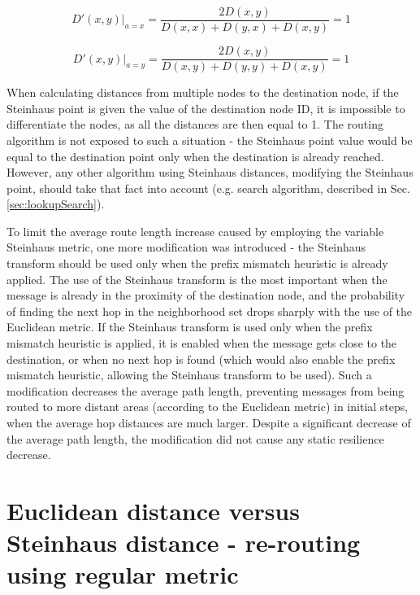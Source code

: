 \begin{equation}
D'(x,y)\bigg|_{a=x} = \frac{2D(x,y)}{D(x,x) + D(y,x) + D(x,y)} = 1
\end{equation}

\begin{equation}
D'(x,y)\bigg|_{a=y} = \frac{2D(x,y)}{D(x,y) + D(y,y) + D(x,y)} = 1
\end{equation}

\noindent
When calculating distances from multiple nodes to the destination node, if the Steinhaus point is given the value of the destination node ID, it is impossible to differentiate the nodes, as all the distances are then equal to 1. The routing algorithm is not exposed to such a situation - the Steinhaus point value would be equal to the destination point only when the destination is already reached. However, any other algorithm using Steinhaus distances, modifying the Steinhaus point, should take that fact into account (e.g. search algorithm, described in Sec. \ref{sec:lookupSearch}).



To limit the average route length increase caused by employing the variable Steinhaus metric, one more modification was introduced - the Steinhaus transform should be used only when the prefix mismatch heuristic is already applied. The use of the Steinhaus transform is the most important when the message is already in the proximity of the destination node, and the probability of finding the next hop in the neighborhood set drops sharply with the use of the Euclidean metric. If the Steinhaus transform is used only when the prefix mismatch heuristic is applied, it is enabled when the message gets close to the destination, or when no next hop is found (which would also enable the prefix mismatch heuristic, allowing the Steinhaus transform to be used). Such a modification decreases the average path length, preventing messages from being routed to more distant areas (according to the Euclidean metric) in initial steps, when the average hop distances are much larger. Despite a significant decrease of the average path length, the modification did not cause any static resilience decrease.






\section{Euclidean distance versus Steinhaus distance - re-routing using regular metric}
\label{sec:euclideanAfterSteinhaus}

